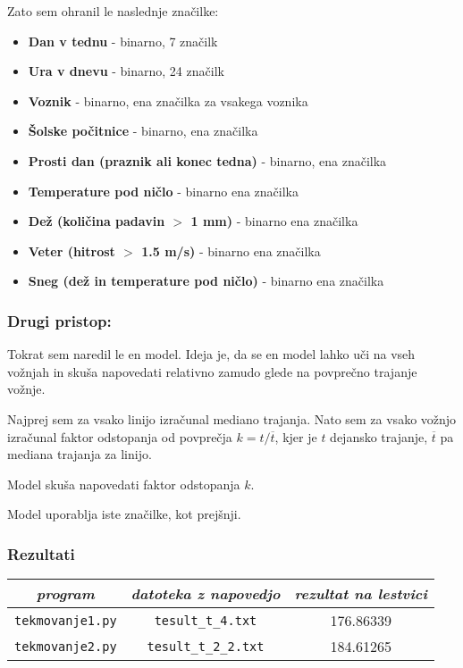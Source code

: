 \documentclass[11pt,a4paper]{article}
\begin{document}
Zato sem ohranil le naslednje značilke:
\begin{itemize}
	\item \textbf{Dan v tednu} - binarno, 7 značilk
	\item \textbf{Ura v dnevu} - binarno, 24 značilk
	\item \textbf{Voznik} - binarno, ena značilka za vsakega voznika
	\item \textbf{Šolske počitnice} - binarno, ena značilka
	\item \textbf{Prosti dan (praznik ali konec tedna)} - binarno, ena značilka
	\item \textbf{Temperature pod ničlo} - binarno ena značilka
	\item \textbf{Dež (količina padavin $>$ 1 mm)} - binarno ena značilka
	\item \textbf{Veter (hitrost $>$ 1.5 m/s)} - binarno ena značilka
	\item \textbf{Sneg (dež in temperature pod ničlo)} - binarno ena značilka
\end{itemize}

\subsubsection*{Drugi pristop:}
Tokrat sem naredil le en model. Ideja je, da se en model lahko uči na vseh vožnjah in
skuša napovedati relativno zamudo glede na povprečno trajanje vožnje.

Najprej sem za vsako linijo izračunal mediano trajanja. Nato sem za vsako vožnjo
izračunal faktor odstopanja od povprečja $k = t / \overline{t}$, kjer je $t$ dejansko trajanje, $\overline{t}$ pa mediana trajanja za linijo.

Model skuša napovedati faktor odstopanja $k$.

Model uporablja iste značilke, kot prejšnji.

\subsubsection*{Rezultati}
\begin{center}
	\begin{tabular}{c | c | c}
		\textit{program} & \textit{datoteka z napovedjo} & \textit{rezultat na lestvici} \\ \hline
		\texttt{tekmovanje1.py} & \texttt{tesult\_t\_4.txt} & 176.86339 \\
		\texttt{tekmovanje2.py} & \texttt{tesult\_t\_2\_2.txt} & 184.61265
	\end{tabular}
\end{center}
\end{document}
